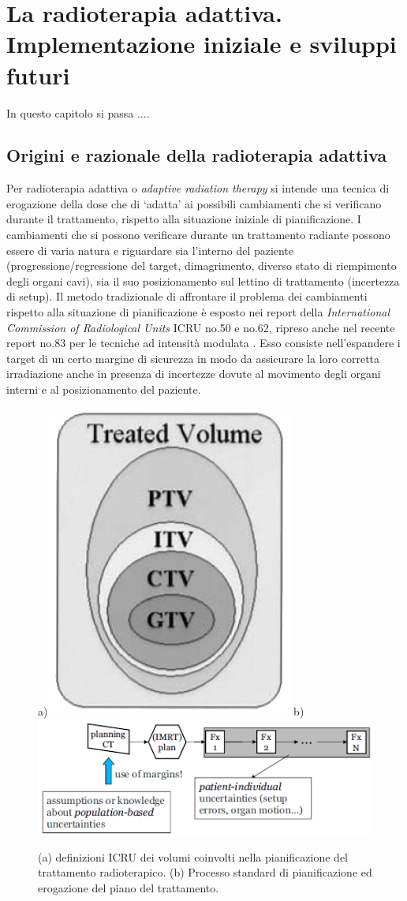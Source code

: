 \chapter{La radioterapia adattiva. Implementazione iniziale e sviluppi futuri}
\minitoc
\textsf{In questo capitolo si passa ....}

\section{Origini e razionale della radioterapia adattiva}
Per radioterapia adattiva o \textit{adaptive radiation therapy} si intende una tecnica di erogazione della dose che di `adatta' ai possibili cambiamenti che si verificano durante il trattamento, rispetto alla situazione iniziale di pianificazione. I cambiamenti che si possono verificare durante un trattamento radiante possono essere di varia natura e riguardare sia l'interno del paziente (progressione/regressione del target, dimagrimento, diverso stato di riempimento degli organi cavi), sia il suo  posizionamento sul lettino di trattamento (incertezza di setup). Il metodo tradizionale di affrontare il problema dei cambiamenti rispetto alla situazione di pianificazione è esposto nei report della \textit{International Commission of Radiological Units} ICRU no.50 e no.62, ripreso anche nel recente report no.83 per le tecniche ad intensità modulata \cite{ICRU2010}. Esso consiste nell'espandere i target di un certo margine di sicurezza in modo da assicurare la loro corretta irradiazione anche in presenza di incertezze dovute al movimento degli organi interni e al posizionamento del paziente.
\begin{figure}
\centering
a)\includegraphics[width=.25\textwidth]{./cap3/ptv.png}
b) \includegraphics[width=.64\textwidth]{./cap3/adapt0.png}
\caption{(a) definizioni ICRU dei volumi coinvolti nella pianificazione del trattamento radioterapico. (b) Processo standard di pianificazione ed erogazione del piano del trattamento.}
\label{fig:adapt0}
\end{figure}

